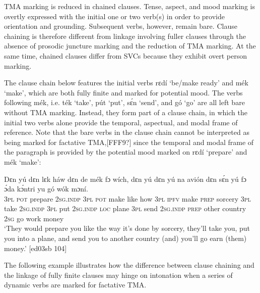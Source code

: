 TMA marking is reduced in chained clauses. Tense, aspect, and mood marking is overtly expressed with the initial one or two verb(s) in order to provide orientation and grounding. Subsequent verbs, however, remain bare. Clause chaining is therefore different from linkage involving fuller clauses through the absence of prosodic juncture marking and the reduction of TMA marking. At the same time, chained clauses differ from SVCs because they exhibit overt person marking.



The clause chain below features the initial verbs rɛdí ‘be/make ready’ and mék ‘make’, which are both fully finite and marked for potential mood. The verbs following mék, i.e. ték ‘take’, pút ‘put’, sɛ́n ‘send’, and gó ‘go’ are all left bare without TMA marking. Instead, they form part of a clause chain, in which the initial two verbs alone provide the temporal, aspectual, and modal frame of reference. Note that the bare verbs in the clause chain cannot be interpreted as being marked for factative TMA,[FFF9?] since the temporal and modal frame of the paragraph is provided by the potential mood marked on rɛdí ‘prepare’ and mék ‘make’:



\ea%
    \label{ex:key:1611}
    \gll Dɛn        yú    dɛn        lɛk  háw    dɛn  de  mék  
fɔ  wích,  dɛn     yú    dɛn    yú    na  avión
dɛn  sɛ́n    yú    fɔ  ɔ́da    kɔ́ntri   yu  gó  wók    mɔní.\\
\textsc{3pl}  \textsc{pot}  prepare  \textsc{2sg.indp}  \textsc{3pl}  \textsc{pot}  make  like  how    \textsc{3pl}  \textsc{ipfv}  make
\textsc{prep} sorcery  \textsc{3pl}  take    \textsc{2sg.indp}  \textsc{3pl}  put  \textsc{2sg.indp}   \textsc{loc}  plane  
\textsc{3pl}  send  \textsc{2sg.indp}  \textsc{prep}  other  country  \textsc{2sg}  go  work  money\\

\glt ‘They would prepare you like the way it’s done by sorcery, they’ll take you, 
put you into a plane, and send you to another country (and) you’ll go earn 
(them) money.’ [ed03sb 104]
\z

The following example illustrates how the difference between clause chaining and the linkage of fully finite clauses may hinge on intonation when a series of dynamic verbs are marked for factative TMA.


